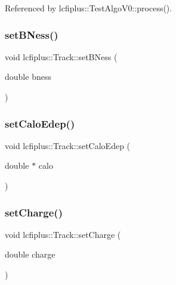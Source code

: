 Referenced by lcfiplus\+::\+Test\+Algo\+V0\+::process().

\mbox{\label{classlcfiplus_1_1Track_a9155bfec71c06d1078ba62e8f43ab8ed}} 
\subsubsection{set\+B\+Ness()}
{\footnotesize\ttfamily void lcfiplus\+::\+Track\+::set\+B\+Ness (\begin{DoxyParamCaption}\item[{double}]{bness }\end{DoxyParamCaption})\hspace{0.3cm}{\ttfamily [inline]}}

\mbox{\label{classlcfiplus_1_1Track_a3169f8ad225877e77eafd037822b0313}} 
\subsubsection{set\+Calo\+Edep()}
{\footnotesize\ttfamily void lcfiplus\+::\+Track\+::set\+Calo\+Edep (\begin{DoxyParamCaption}\item[{double $\ast$}]{calo }\end{DoxyParamCaption})\hspace{0.3cm}{\ttfamily [inline]}}

\mbox{\label{classlcfiplus_1_1Track_aecae9a848e41d621db9401736f845ca0}} 
\subsubsection{set\+Charge()}
{\footnotesize\ttfamily void lcfiplus\+::\+Track\+::set\+Charge (\begin{DoxyParamCaption}\item[{double}]{charge }\end{DoxyParamCaption})\hspace{0.3cm}{\ttfamily [inline]}}

\mbox{\label{classlcfiplus_1_1Track_a23acdcbe000c36817c6ed3142ae9766a}} 
